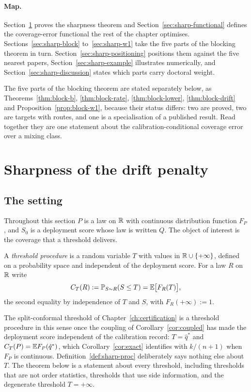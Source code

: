 \documentclass[../../../main.tex]{subfiles}
\begin{document}
\paragraph{Map.} Section~\ref{sec:sharp-thm8} proves the sharpness theorem and Section~\ref{sec:sharp-functional} defines the coverage-error functional the rest of the chapter optimises. Sections~\ref{sec:sharp-block} to~\ref{sec:sharp-w1} take the five parts of the blocking theorem in turn. Section~\ref{sec:sharp-positioning} positions them against the five nearest papers, Section~\ref{sec:sharp-example} illustrates numerically, and Section~\ref{sec:sharp-discussion} states which parts carry doctoral weight.

The five parts of the blocking theorem are stated separately below, as Theorems~\ref{thm:block-b}, \ref{thm:block-rate}, \ref{thm:block-lower}, \ref{thm:block-drift} and Proposition~\ref{prop:block-w1}, because their status differs: two are proved, two are targets with routes, and one is a specialisation of a published result. Read together they are one statement about the calibration-conditional coverage error over a mixing class.

\section{Sharpness of the drift penalty}\label{sec:sharp-thm8}

\subsection{The setting}

Throughout this section $P$ is a law on $\mathbb{R}$ with continuous distribution function $F_P$, and $S_0$ is a deployment score whose law is written $Q$. The object of interest is the coverage that a threshold delivers.

\begin{definition}\label{def:sharp-proc}
A \emph{threshold procedure} is a random variable $T$ with values in $\mathbb{R}\cup\{+\infty\}$, defined on a probability space and independent of the deployment score. For a law $R$ on $\mathbb{R}$ write
\[
C_T(R):=\mathbb{P}_{S\sim R}(S\le T)=\mathbb{E}\big[F_R(T)\big],
\]
the second equality by independence of $T$ and $S$, with $F_R(+\infty):=1$.
\end{definition}

The split-conformal threshold of Chapter~\ref{ch:certification} is a threshold procedure in this sense once the coupling of Corollary~\ref{cor:coupled} has made the deployment score independent of the calibration record: $T=\hat q^*$ and $C_T(P)=\mathbb{E} F_P(\hat q^*)$, which Corollary~\ref{cor:exact} identifies with $k/(n+1)$ when $F_P$ is continuous. Definition~\ref{def:sharp-proc} deliberately says nothing else about $T$. The theorem below is a statement about every threshold, including thresholds that are not order statistics, thresholds that use side information, and the degenerate threshold $T=+\infty$.
\end{document}
